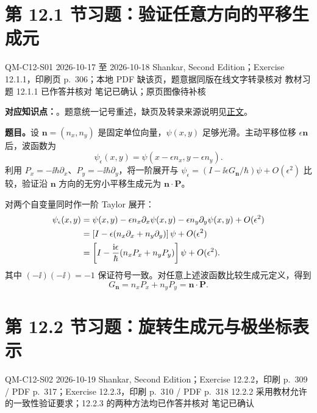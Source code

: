 \section{第 12.1 节习题：验证任意方向的平移生成元}
\label{exercises:QM-C12-S01}
\exercisemeta
  {QM-C12-S01}
  {2026-10-17 至 2026-10-18}
  {Shankar, Second Edition；Exercise 12.1.1，印刷页 p.~306；本地 PDF 缺该页，题意据同版在线文字转录核对}
  {教材习题 12.1.1 已作答并核对}
  {笔记已确认；原页图像待补核}

\textbf{对应知识点：}。题意统一记号重述，缺页及转录来源说明见\hyperref[section:QM-C12-S01]{正文}。

\textbf{题目。}设 $\mathbf n=(n_x,n_y)$ 是固定单位向量，$\psi(x,y)$ 足够光滑。主动平移位移 $\epsilon\mathbf n$ 后，波函数为
\begin{equation}
  \psi_\epsilon(x,y)=\psi(x-\epsilon n_x,y-\epsilon n_y).
\end{equation}
利用 $P_x=-\ii\hbar\partial_x$、$P_y=-\ii\hbar\partial_y$，将一阶展开与
$\psi_\epsilon=(I-\ii\epsilon G_{\mathbf n}/\hbar)\psi+O(\epsilon^2)$ 比较，验证沿 $\mathbf n$ 方向的无穷小平移生成元为 $\mathbf n\cdot\mathbf P$。

\begin{checkedsolution}
对两个自变量同时作一阶 Taylor 展开：
\begin{align}
  \psi_\epsilon(x,y)
  &=\psi(x,y)-\epsilon n_x\partial_x\psi(x,y)
    -\epsilon n_y\partial_y\psi(x,y)+O(\epsilon^2)\notag\\
  &=\left[I-\epsilon(n_x\partial_x+n_y\partial_y)\right]\psi
    +O(\epsilon^2)\notag\\
  &=\left[I-\frac{\mathrm{i}\epsilon}{\hbar}(n_xP_x+n_yP_y)\right]\psi
    +O(\epsilon^2).
\end{align}
其中 $(-\ii)(-\ii)=-1$ 保证符号一致。对任意上述波函数比较生成元定义，得到
\begin{equation}
  \boxed{G_{\mathbf n}=n_xP_x+n_yP_y=\mathbf n\cdot\mathbf P}.
\end{equation}
\end{checkedsolution}

\section{第 12.2 节习题：旋转生成元与极坐标表示}
\label{exercises:QM-C12-S02}
\exercisemeta
  {QM-C12-S02}
  {2026-10-19}
  {Shankar, Second Edition；Exercise 12.2.2，印刷 p.~309 / PDF p.~317；Exercise 12.2.3，印刷 p.~310 / PDF p.~318}
  {12.2.2 采用教材允许的一致性验证要求；12.2.3 的两种方法均已作答并核对}
  {笔记已确认}

